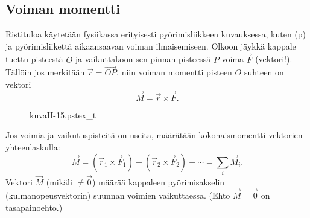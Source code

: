 \subsection*{Voiman momentti}

Ristituloa käytetään fysiikassa erityisesti pyörimisliikkeen kuvauksessa, kuten 
(p) ja pyörimisliikettä aikaansaavan voiman  
ilmaisemiseen. Olkoon jäykkä kappale tuettu pisteestä $O$ ja vaikuttakoon sen pinnan pisteessä 
$P$ voima $\vec F$ (vektori!). Tällöin jos merkitään $\vec r = \overrightarrow{OP}$, niin 
voiman momentti pisteen $O$ suhteen on vektori
\[
\vec M = \vec r \times \vec F.
\]
\begin{figure}[H]
\begin{center}
{kuvaII-15.pstex_t}
\end{center}
\end{figure}
Jos voimia ja vaikutuspisteitä on useita, määrätään kokonaismomentti vektorien yhteenlaskulla:
\[
\vec M=(\vec r_1 \times \vec F_1) + (\vec r_2 \times \vec F_2) + \cdots = \sum_i\vec M_i.
\]
Vektori $\vec M$ (mikäli $\neq \vec 0$) määrää kappaleen pyörimisakselin (kulmanopeusvektorin)
suunnan voimien vaikuttaessa. (Ehto $\vec M = \vec 0$ on tasapainoehto.)